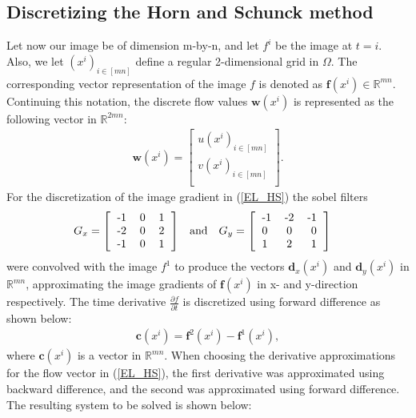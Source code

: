 \documentclass[10pt,a4paper]{article}
\begin{document}
\subsection{Discretizing the Horn and Schunck method}
\label{sec: disc}
Let now our image be of dimension m-by-n, and let $f^i$ be the image at $t=i$. Also, we let $(x^i)_ {i \in [mn]}$ define a regular 2-dimensional grid in $\Omega$. The corresponding vector representation of the image $f$ is denoted as $\textbf{f}(x^i) \in \mathbb{R}^{mn}$. Continuing this notation, the discrete flow values $\textbf{w}(x^i)$ is represented as the following vector in $\mathbb{R}^{2mn}$:
\begin{align*}
     \textbf{w}(x^i)=\begin{bmatrix}
         u(x^i)_{i\in [mn]}  \\
         v(x^i)_{i \in [mn]} \\
        \end{bmatrix}.
\end{align*}
For the discretization of the image gradient in (\ref{EL_HS}) the sobel filters
\begin{align*}
G_x =
\left[ 
\begin{tabular}{ l c r }
  -1 & 0 & 1 \\
  -2 & 0 & 2 \\
  -1 & 0 & 1 \\
\end{tabular}
\right] & &\text{and} & & 
G_y =
\left[ 
\begin{tabular}{ l c r }
  -1 & -2 & -1 \\
  0 & 0 & 0 \\
  1 & 2 & 1 \\
\end{tabular}
\right] &
\end{align*}
were convolved with the image $f^1$ to produce the vectors $\textbf{d}_x(x^i)$ and $\textbf{d}_y(x^i)$ in $\mathbb{R}^{mn}$, approximating the image gradients of $\textbf{f}(x^i)$ in x- and y-direction respectively. The time derivative $\frac{\partial f}{\partial t}$ is discretized using forward difference as shown below:
\begin{align*}
\textbf{c}(x^i) = \textbf{f}^2(x^i) - \textbf{f}^1(x^i),
\end{align*} 
where $\textbf{c}(x^i)$ is a vector in $\mathbb{R}^{mn}$. When choosing the derivative approximations for the flow vector in (\ref{EL_HS}), the first derivative was approximated using backward difference, and the second was approximated using forward difference. The resulting system to be solved is shown below:
\end{document}
